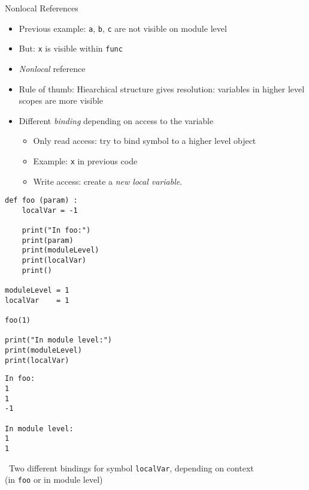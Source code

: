 \begin{frame}{Nonlocal References}
%
\begin{itemize}
\item Previous example: \texttt{a}, \texttt{b}, \texttt{c} are not visible on module level
\item But: \texttt{x} is visible within \texttt{func}
\item \emph{Nonlocal} reference
\item Rule of thumb: Hiearchical structure gives resolution: variables in higher level scopes are more visible
\item Different \emph{binding} depending on access to the variable
	\begin{itemize}
	\item Only read access: try to bind symbol to a higher level object
	\item Example: \texttt{x} in previous code
	\item Write access: create a \emph{new local variable}.
	\end{itemize}
\end{itemize}
%
\end{frame}


\begin{frame}[fragile]
%
\begin{tcbraster}[raster columns=2,
                  raster equal height,
                  nobeforeafter,
                  raster column skip=0.5cm]
\begin{codebox}
\begin{verbatim}
def foo (param) :
    localVar = -1

    print("In foo:")
    print(param)
    print(moduleLevel)
    print(localVar)
    print()

moduleLevel = 1
localVar    = 1

foo(1)

print("In module level:")
print(moduleLevel)
print(localVar)
\end{verbatim}
\end{codebox}
%
\begin{cmdbox}
\begin{verbatim}
In foo:
1
1
-1

In module level:
1
1
\end{verbatim}
\end{cmdbox}
\end{tcbraster}
%
\Thus~Two different bindings for symbol \texttt{localVar}, depending on context\\
\phantom{.}\qquad(in \texttt{foo} or in module level)
%
\end{frame}

